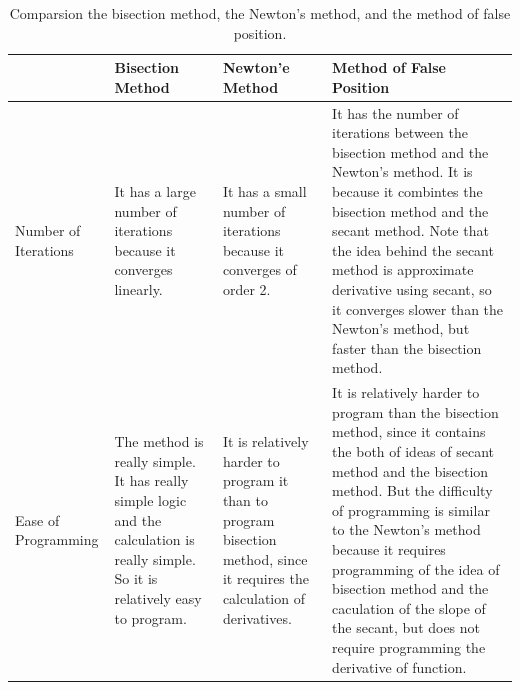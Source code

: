 \documentclass{article}
\begin{document}
\begin{enumerate}
\begin{enumerate}[wide=10pt]
        \begin{table}[ht]
            \caption{Comparsion the bisection method, the Newton's method, and the method of false position.}
            \label{table:table1}
            \centering
            \begin{tabular}{|p{2.2cm}|p{3.5cm}|p{3.5cm}|p{5cm}|}
            \hline
                                     & Bisection Method                                                                                                                   & Newton'e Method                                                                                                                                                                                                         & Method of False Position                                                                                                                                                                                                                                                                                                                                                                     \\ \hline
            Number of \newline Iterations     & It has a large number of iterations because it converges linearly.                                                                 & It has a small number of iterations because it converges of order 2.                                                                                                                                                    & It has the number of iterations between the bisection method and the Newton's method. It is because it combintes the bisection method and the secant method. Note that the idea behind the secant method is approximate derivative using secant, so it converges slower than the Newton's method, but faster than the bisection method.                                                      \\ \hline
            Ease of \newline Programming      & The method is really simple. It has really simple logic and the calculation is really simple. So it is relatively easy to program. & It is relatively harder to program it than to program bisection method, since it requires the calculation of derivatives.                                                                                               & It is relatively harder to program than the bisection method, since it contains the both of ideas of secant method and the bisection method. But the difficulty of programming is similar to the Newton's method because it requires programming of the idea of bisection method and the caculation of the slope of the secant, but does not require programming the derivative of function. \\ \hline

\end{tabular}
\end{table}
\end{enumerate}
\end{enumerate}
\end{document}
